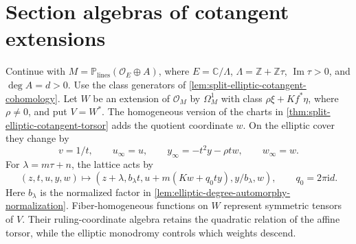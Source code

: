 \section{Section algebras of cotangent extensions}
\label{sec:elliptic-cotangent-extension-algebra}

Continue with $M=\mathbb P_{\mathrm{lines}}(\mathcal O_E\oplus A)$, where $E=\mathbb C/\Lambda$, $\Lambda=\mathbb Z+\mathbb Z\tau$, $\operatorname{Im}\tau>0$, and $\deg A=d>0$. Use the class generators of \cref{lem:split-elliptic-cotangent-cohomology}. Let $W$ be an extension of $\mathcal O_M$ by $\Omega_M^1$ with class $\rho\xi+Kf^*\eta$, where $\rho\ne0$, and put $V=W^*$. The homogeneous version of the charts in \cref{thm:split-elliptic-cotangent-torsor} adds the quotient coordinate $w$. On the elliptic cover they change by
\[
 v=1/t,\qquad u_\infty=u,\qquad
 y_\infty=-t^2y-\rho t w,\qquad w_\infty=w.
\]
For $\lambda=m\tau+n$, the lattice acts by
\[
 (z,t,u,y,w)\longmapsto
 (z+\lambda,b_\lambda t,u+m(Kw+q_0ty),y/b_\lambda,w),
 \qquad q_0=2\pi\mathrm{i}d.
\]
Here $b_\lambda$ is the normalized factor in \cref{lem:elliptic-degree-automorphy-normalization}. Fiber-homogeneous functions on $W$ represent symmetric tensors of $V$. Their ruling-coordinate algebra retains the quadratic relation of the affine torsor, while the elliptic monodromy controls which weights descend.

